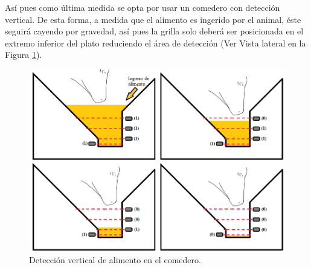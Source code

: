     Así pues como última medida se opta por usar un comedero con detección vertical. De esta forma, a medida que el alimento es ingerido por el animal, éste seguirá cayendo por gravedad, así pues la grilla solo deberá ser posicionada en el extremo inferior del plato reduciendo el área de detección (Ver Vista lateral en la Figura \ref{infra4png}).
    
    \vspace{-200}
    
    \begin{figure}[H]
	    \begin{center}
    	\includegraphics[scale=0.75]{img/infra42.png}
        \end{center}
	    \caption{Detección vertical de alimento en el comedero. \label{infra4png}}
    \end{figure}
    \pagebreak
    
    
   
    
    
